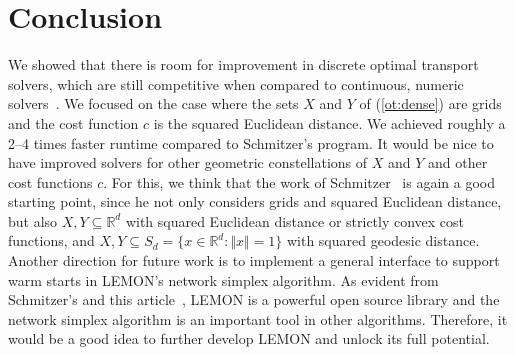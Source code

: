 \documentclass[a4paper,UKenglish,cleveref, autoref, thm-restate]{lipics-v2021}
\begin{document}
\section{Conclusion}
We showed that there is room for improvement in discrete optimal transport solvers, which are still competitive when compared to continuous, numeric solvers~\cite{schrieber2017dotmark}.
We focused on the case where the sets $X$ and $Y$ of (\ref{ot:dense}) are grids and the cost function $c$ is the squared Euclidean distance.
We achieved roughly a 2--4 times faster runtime compared to Schmitzer's program.
It would be nice to have improved solvers for other geometric constellations of $X$ and $Y$ and other cost functions $c$.
For this, we think that the work of Schmitzer~\cite{schmitzer2016sparse} is again a good starting point, since he not only considers grids and squared Euclidean distance, but also $X,Y \subseteq \mathbb{R}^d$ with squared Euclidean distance or strictly convex cost functions, and $X,Y \subseteq S_d = \{x \in \mathbb{R}^d: \Vert x \Vert = 1\}$ with squared geodesic distance.
Another direction for future work is to implement a general interface to support warm starts in LEMON's network simplex algorithm.
As evident from Schmitzer's and this article~\cite{schmitzer2016sparse}, LEMON is a powerful open source library and the network simplex algorithm is an important tool in other algorithms.
Therefore, it would be a good idea to further develop LEMON and unlock its full potential.



\newpage
\appendix
\end{document}
